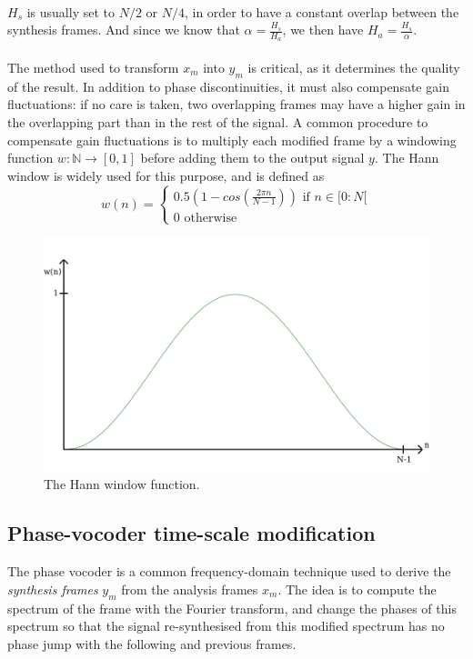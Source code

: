 \documentclass[letterpaper]{article}
\begin{document}
\paragraph{}
\(H_s\) is usually set to \(N/2\) or \(N/4\), in order to have a constant
overlap between the synthesis frames. And since we know that
\(\alpha=\frac{H_s}{H_a}\), we then have \(H_a=\frac{H_s}{\alpha}\).
\paragraph{}
The method used to transform \(x_m\) into \(y_m\) is critical, as it determines
the quality of the result. In addition to phase discontinuities, it must also
compensate gain fluctuations: if no care is taken, two overlapping frames may
have a higher gain in the overlapping part than in the rest of the signal.
A common procedure to compensate gain fluctuations is to multiply each modified
frame by a windowing function \(w:\mathbb{N}\to[0,1]\) before adding them to the
output signal \(y\). The Hann window is widely used for this purpose, and is
defined as
\begin{equation}
\label{hann}
w(n)=\begin{cases}
  0.5(1-cos(\frac{2\pi n}{N-1}))\text{ if }n\in[0:N[\\
  0 \text{ otherwise}\end{cases}
\end{equation}
\begin{figure}[h]
\includegraphics[width=\linewidth]{hann.png}
\caption{The Hann window function.}
\end{figure}

\subsection{Phase-vocoder time-scale modification}
The phase vocoder is a common frequency-domain technique used to derive the
\emph{synthesis frames} \(y_m\)  from the analysis frames \(x_m\). The idea
is to compute the spectrum of the frame with the Fourier transform, and change
the phases of this spectrum so that the signal re-synthesised from this modified
spectrum has no phase jump with the following and previous frames.
\end{document}
